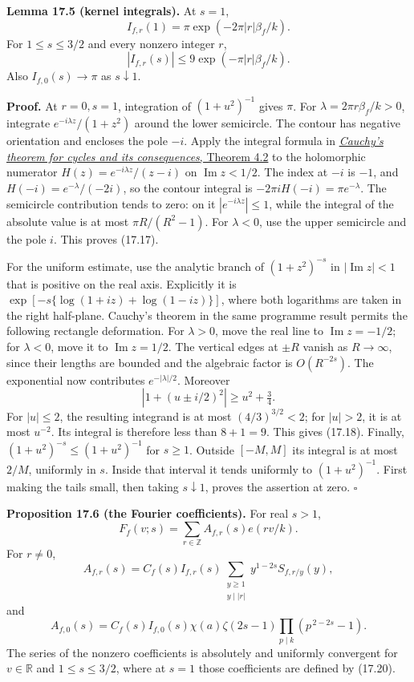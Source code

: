 \documentclass[
  11pt,
  a4paper,
]{article}
\begin{document}
\textbf{Lemma 17.5 (kernel integrals).} At \(s=1\), \[
 I_{f,r}(1)=\pi\exp(-2\pi|r|\beta_f/k).
 \tag{17.17}
\] For \(1\le s\le3/2\) and every nonzero integer \(r\), \[
 |I_{f,r}(s)|\le9\exp(-\pi|r|\beta_f/k).
 \tag{17.18}
\] Also \(I_{f,0}(s)\longrightarrow\pi\) as \(s\downarrow1\).

\textbf{Proof.} At \(r=0,s=1\), integration of \((1+u^2)^{-1}\) gives
\(\pi\). For \(\lambda=2\pi r\beta_f/k>0\), integrate
\(e^{-i\lambda z}/(1+z^2)\) around the lower semicircle. The contour has
negative orientation and encloses the pole \(-i\). Apply the integral
formula in
\href{https://kokunoyumeto.github.io/open-math-courses-public/courses/foundations-of-von-neumann-algebras/cauchy-s-theorem-for-cycles-and-its-consequences.html\#OA-FND-CT-04}{\emph{Cauchy's
theorem for cycles and its consequences}, Theorem 4.2} to the
holomorphic numerator \(H(z)=e^{-i\lambda z}/(z-i)\) on
\(\operatorname{Im}z<1/2\). The index at \(-i\) is \(-1\), and
\(H(-i)=e^{-\lambda}/(-2i)\), so the contour integral is
\(-2\pi iH(-i)=\pi e^{-\lambda}\). The semicircle contribution tends to
zero: on it \(|e^{-i\lambda z}|\le1\), while the integral of the
absolute value is at most \(\pi R/(R^2-1)\). For \(\lambda<0\), use the
upper semicircle and the pole \(i\). This proves (17.17).

For the uniform estimate, use the analytic branch of \((1+z^2)^{-s}\) in
\(|\operatorname{Im}z|<1\) that is positive on the real axis. Explicitly
it is \(\exp[-s\{\log(1+iz)+\log(1-iz)\}]\), where both logarithms are
taken in the right half-plane. Cauchy's theorem in the same programme
result permits the following rectangle deformation. For \(\lambda>0\),
move the real line to \(\operatorname{Im}z=-1/2\); for \(\lambda<0\),
move it to \(\operatorname{Im}z=1/2\). The vertical edges at \(\pm R\)
vanish as \(R\to\infty\), since their lengths are bounded and the
algebraic factor is \(O(R^{-2s})\). The exponential now contributes
\(e^{-|\lambda|/2}\). Moreover \[
 |1+(u\pm i/2)^2|\ge u^2+\tfrac34.
\] For \(|u|\le2\), the resulting integrand is at most
\((4/3)^{3/2}<2\); for \(|u|>2\), it is at most \(u^{-2}\). Its integral
is therefore less than \(8+1=9\). This gives (17.18). Finally,
\((1+u^2)^{-s}\le(1+u^2)^{-1}\) for \(s\ge1\). Outside \([-M,M]\) its
integral is at most \(2/M\), uniformly in \(s\). Inside that interval it
tends uniformly to \((1+u^2)^{-1}\). First making the tails small, then
taking \(s\downarrow1\), proves the assertion at zero. \(\square\)

\textbf{Proposition 17.6 (the Fourier coefficients).} For real \(s>1\),
\[
 F_f(v;s)=\sum_{r\in\mathbb Z}A_{f,r}(s)e(rv/k).
 \tag{17.19}
\] For \(r\ne0\), \[
 A_{f,r}(s)=C_f(s)I_{f,r}(s)
       \sum_{\substack{y\ge1\\y\mid |r|}}
              y^{1-2s}S_{f,r/y}(y),
 \tag{17.20}
\] and \[
 A_{f,0}(s)=
 C_f(s)I_{f,0}(s)\chi(a)\zeta(2s-1)
             \prod_{p\mid k}(p^{\,2-2s}-1).
 \tag{17.21}
\] The series of the nonzero coefficients is absolutely and uniformly
convergent for \(v\in\mathbb R\) and \(1\le s\le3/2\), where at \(s=1\)
those coefficients are defined by (17.20).
\end{document}
